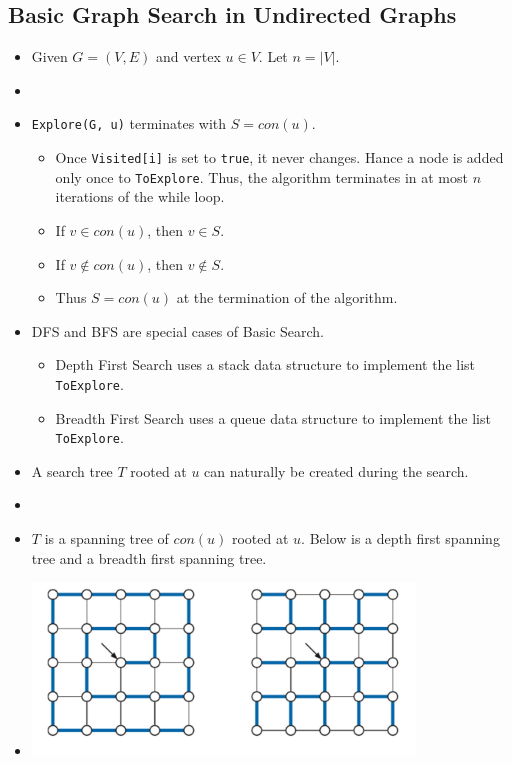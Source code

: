 \documentclass[12pt]{article}
\begin{document}
\subsection{Basic Graph Search in Undirected Graphs}
\begin{itemize}
    \item Given $G = (V, E)$ and vertex $u \in V$. Let $n = \left|V\right|$.
    \item[] 
    \item \texttt{Explore(G, u)} terminates with $S = con(u)$.
    \begin{itemize}
        \item Once \texttt{Visited[i]} is set to \texttt{true}, it never changes. Hance a node is added only once to \texttt{ToExplore}. Thus, the algorithm terminates in at most $n$ iterations of the while loop.
        \item If $v \in con(u)$, then $v \in S$.
        \item If $v \notin con(u)$, then $v \notin S$.
        \item Thus $S = con(u)$ at the termination of the algorithm.
    \end{itemize}
    \item DFS and BFS are special cases of Basic Search.
    \begin{itemize}
        \item Depth First Search uses a stack data structure to implement the list \texttt{ToExplore}.
        \item Breadth First Search uses a queue data structure to implement the list \texttt{ToExplore}.
    \end{itemize}
    \item A search tree $T$ rooted at $u$ can naturally be created during the search.
    \item[] 
    \item $T$ is a spanning tree of $con(u)$ rooted at $u$. Below is a depth first spanning tree and a breadth first spanning tree.
    \item[] \includegraphics[width=0.8\textwidth]{images/spanning-tree.jpg}
\end{itemize}
\end{document}
